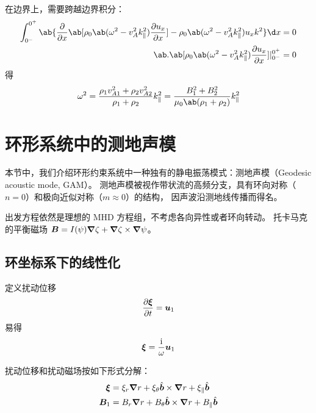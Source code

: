 在边界上，需要跨越边界积分：
\begin{equation}\begin{aligned}
\int_{0^-}^{0^+} \ab\{
    \pdv{}{x} \ab[ \rho_0 \ab( \omega^2 - v_A^2 k_\parallel^2 ) \pdv{u_x}{x} ]
    - \rho_0 \ab( \omega^2 - v_A^2 k_\parallel^2 ) u_x k^2
\} \d x &=0 \\
\ab.\ab[
    \rho_0 \ab( \omega^2 - v_A^2 k_\parallel^2 ) \pdv{u_x}{x}
]|_{0^-}^{0^+} &= 0
\end{aligned}\end{equation}
得
\begin{equation}
\omega^2 = \frac{\rho_1 v_{A1}^2 + \rho_2 v_{A2}^2}{\rho_1 + \rho_2} k_\parallel^2
= \frac{B_1^2 + B_2^2}{\mu_0 \ab(\rho_1 + \rho_2)} k_\parallel^2
\end{equation}

\section{环形系统中的测地声模}

本节中，我们介绍环形约束系统中一种独有的静电振荡模式：测地声模（Geodesic acoustic mode, GAM）。
测地声模被视作带状流的高频分支，具有环向对称（$n = 0$）和极向近似对称（$m \approx 0$）的结构，
因声波沿测地线传播而得名。

出发方程依然是理想的 MHD 方程组，不考虑各向异性或者环向转动。
托卡马克的平衡磁场 $\bm{B} = I(\psi) \bm{\nabla}{\zeta} + \bm{\nabla}{\zeta} \times \bm{\nabla}{\psi} $。

\subsection{环坐标系下的线性化}

定义扰动位移
\begin{equation}
\pdv{\bm{\xi}}{t} = \bm{u}_1
\end{equation}
易得
\begin{equation}
\bm{\xi} = \frac{\mathrm{i}}{\omega} \bm{u}_1
\end{equation}

扰动位移和扰动磁场按如下形式分解：
\begin{subequations}\begin{align}
\bm{\xi} &
= \xi_r \bm{\nabla}{r}
+ \xi_\theta \hat{\bm{b}} \times \bm{\nabla}{r}
+ \xi_\parallel \hat{\bm{b}} \\
\bm{B}_1 &
= B_r \bm{\nabla}{r}
+ B_\theta \hat{\bm{b}} \times \bm{\nabla}{r}
+ B_\parallel \hat{\bm{b}}
\end{align}\end{subequations}

